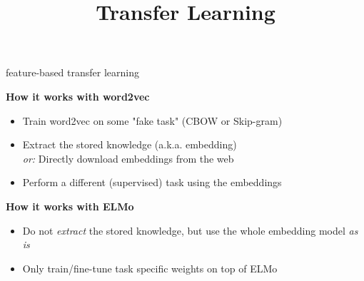 


\usepackage{colortbl}

\newcommand{\titlefigure}{figure/transfer_learning_taxonomy-1.png}
\newcommand{\learninggoals}{
\item Differentiate the different flavors of transfer learning
\item Understand the challenges we might be able to overcome by using transfer learning}

\title{Transfer Learning}
\date{}




\begin{frame}{feature-based transfer learning}

\vfill

	\textbf{How it works with word2vec}
	
	\begin{itemize}
		\item Train word2vec on some "fake task" (CBOW or Skip-gram)
		\item Extract the stored knowledge (a.k.a. embedding)\\
					\textit{or:} Directly download embeddings from the web 
		\item Perform a different (supervised) task using the embeddings
	\end{itemize}
	
	\vspace{.3cm}
	
	\textbf{How it works with ELMo}
	
	\begin{itemize}
		\item Do not \textit{extract} the stored knowledge, but use the whole embedding model \textit{as is}
		\item Only train/fine-tune task specific weights on top of ELMo
	\end{itemize}
	
\vfill

\end{frame}


